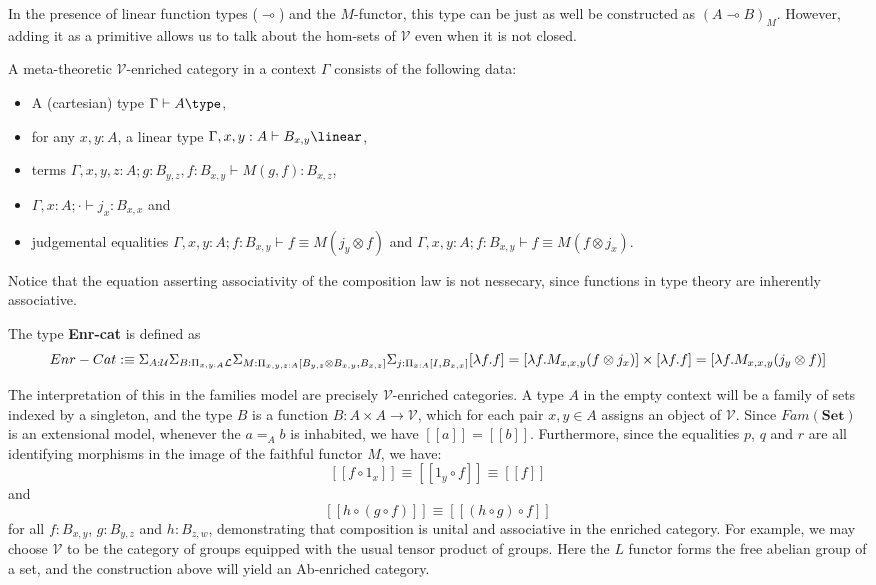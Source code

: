 In the presence of linear function types ($\multimap$) and the $M$-functor, this type can be just as well be constructed as $(A \multimap B)_M$. However, adding it as a primitive allows us to talk about the hom-sets of $\mathcal{V}$ even when it is not closed.\\
\begin{defn}
  A meta-theoretic $\mathcal{V}$-enriched category in a context $\Gamma$ consists of the following data:
 \begin{itemize}
\item A (cartesian) type $\Gamma \vdash A \type$,
\item for any $x, y : A$, a linear type $\Gamma, x, y : A \vdash B_{x, y} \linear$,
\item terms $\Gamma, x, y, z : A; g: B_{y, z}, f:  B_{x, y} \vdash M(g, f) : B_{x, z}$,
\item $\Gamma, x : A; \cdot \vdash j_x : B_{x, x}$ and
\item judgemental equalities $\Gamma, x, y : A; f : B_{x, y} \vdash f \equiv M(j_y \otimes f)$ and $\Gamma, x, y : A; f : B_{x, y} \vdash f \equiv M(f \otimes j_x)$.
\end{itemize}
\end{defn}
Notice that the equation asserting associativity of the composition law is not nessecary, since functions in type theory are inherently associative.
\begin{defn}
  The type \textbf{Enr-cat} is defined as
  \[
    Enr-Cat :\equiv \Sigma_{A : \mathcal{U}} \Sigma_{B : \Pi_{x, y : A}\mathcal{L}} \Sigma_{M : \Pi_{x, y, z : A} [B_{y, z} \otimes B_{x, y}, B_{x,z}]} \Sigma_{j : \Pi_{x: A}[I, B_{x, x}]}[\lambda f. f] = [\lambda f. M_{x, x, y}(f \otimes j_x)] \times [\lambda f. f] = [\lambda f. M_{x, x, y}(j_y \otimes f)] \\
  \]
\end{defn}
The interpretation of this in the families model are precisely $\mathcal{V}$-enriched categories. A type $A$ in the empty context will be a family of sets indexed by a singleton, and the type $B$ is a function $B : A \times A \to \mathcal{V}$, which for each pair $x, y \in A$ assigns an object of $\mathcal{V}$.
Since $Fam(\mathbf{Set})$ is an extensional model, whenever the $a =_A b$ is inhabited, we have $[[a]]=[[b]]$. Furthermore, since the equalities $p$, $q$ and $r$ are all identifying morphisms in the image of the faithful functor $M$, we have:
\[
[[f \circ 1_x ]] \equiv [[1_y \circ f]] \equiv [[f]]
\]
and
\[
[[h \circ (g \circ f)]] \equiv [[(h \circ g) \circ f]]
\]
for all $f : B_{x,y}$, $g : B_{y,z}$ and $h : B_{z,w}$, demonstrating that composition is unital and associative in the enriched category.
For example, we may choose $\mathcal{V}$ to be the category of groups equipped with the usual tensor product of groups. Here the $L$ functor forms the free abelian group of a set, and the construction above will yield an Ab-enriched category.
